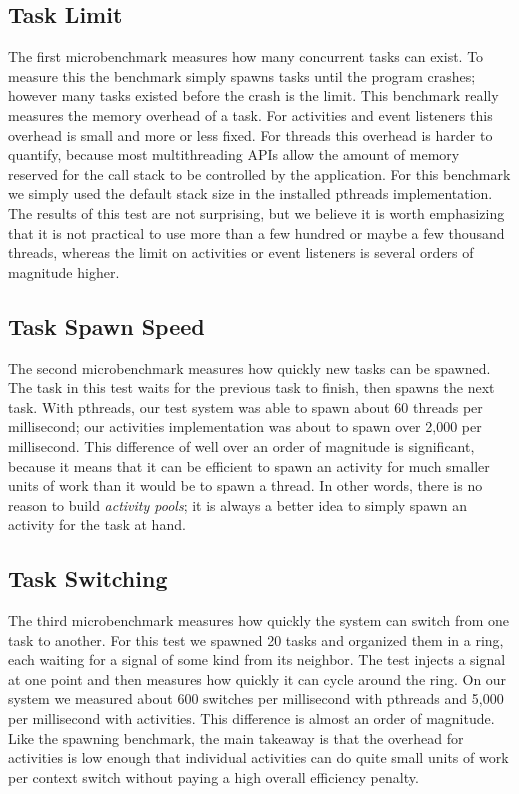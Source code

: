 \documentclass[10pt,preprint]{sigplanconf}
\begin{document}
\subsection{Task Limit}

The first microbenchmark measures how many concurrent tasks can exist.
To measure this the benchmark simply spawns tasks until the program crashes; however many tasks existed before the crash is the limit.
This benchmark really measures the memory overhead of a task.
For activities and event listeners this overhead is small and more or less fixed.
For threads this overhead is harder to quantify, because most multithreading APIs allow the amount of memory reserved for the call stack to be controlled by the application.
For this benchmark we simply used the default stack size in the installed pthreads implementation.
The results of this test are not surprising, but we believe it is worth emphasizing that it is not practical to use more than a few hundred or maybe a few thousand threads, whereas the limit on activities or event listeners is several orders of magnitude higher.

\subsection{Task Spawn Speed}


The second microbenchmark measures how quickly new tasks can be spawned.
The task in this test waits for the previous task to finish, then spawns the next task.
With pthreads, our test system was able to spawn about 60 threads per millisecond; our activities implementation was about to spawn over 2,000 per millisecond.
This difference of well over an order of magnitude is significant, because it means that it can be efficient to spawn an activity for much smaller units of work than it would be to spawn a thread.
In other words, there is no reason to build \emph{activity pools}; it is always a better idea to simply spawn an activity for the task at hand.

\subsection{Task Switching}

The third microbenchmark measures how quickly the system can switch from one task to another.
For this test we spawned 20 tasks and organized them in a ring, each waiting for a signal of some kind from its neighbor.
The test injects a signal at one point and then measures how quickly it can cycle around the ring.
On our system we measured about 600 switches per millisecond with pthreads and 5,000 per millisecond with activities.
This difference is almost an order of magnitude.
Like the spawning benchmark, the main takeaway is that the overhead for activities is low enough that individual activities can do quite small units of work per context switch without paying a high overall efficiency penalty.
\end{document}
